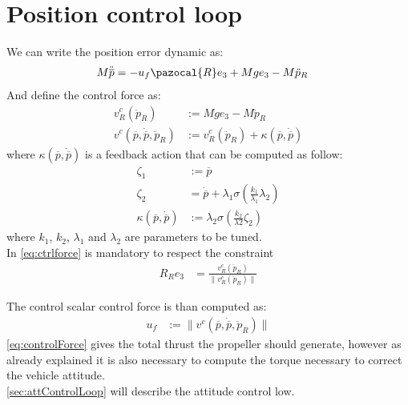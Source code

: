 \section{Position control loop}
We can write the position error dynamic as:
\begin{equation} \label{eq:poserrdyn}
\begin{split}
M \ddot{\overline{p}} &= -u_{f}\pazocal{R}e_{3} + Mge_{3} - M\ddot{p}_{R}
\end{split}
\end{equation}
And define the control force as:
\begin{equation} \label{eq:ctrlforce}
\begin{split}
v^{c}_{R}(\ddot{p}_{R})&:=Mge_{3} - M\ddot{p}_{R}\\
v^{c}(\overline{p},\dot{\overline{p}},\ddot{p}_{R})&:=v^{c}_{R}(\ddot{p}_{R}) + \kappa(\overline{p},\dot{\overline{p}} )
\end{split}
\end{equation}
where $ \kappa(\overline{p},\dot{\overline{p}}) $ is a feedback action that can be computed as follow:
\begin{equation} \label{eq:feedback}
\begin{split}
\zeta_{1}&:=\overline{p}\\
\zeta_{2}&=\dot{\overline{p}} + \lambda_{1} \sigma (\frac{k_{1}}{\lambda_{1}}\lambda_{2})\\
\kappa(\overline{p},\dot{\overline{p}}) &:=\lambda_{2}\sigma(\frac{k_{2}}{\lambda{2}}\zeta_{2})
\end{split}
\end{equation}
where $k_{1}$, $k_{2}$, $\lambda_{1}$ and $\lambda_{2}$ are parameters to be tuned.\\
In \autoref{eq:ctrlforce} is mandatory to respect the constraint
\begin{equation} \label{eq:const}
\begin{split}
R_{R}e_{3} &= \frac{v^{c}_{R}(\ddot{p}_{R})}{\lVert v^{c}_{R}(\ddot{p}_{R})\rVert}
\end{split}
\end{equation}

The control scalar control force is than computed as:
\begin{equation} \label{eq:controlForce}
\begin{split}
u_{f} &:= \lVert v^{c}(\overline{p},\dot{\overline{p}},\ddot{p}_{R})\rVert
\end{split}
\end{equation}
\autoref{eq:controlForce} gives the total thrust the propeller should generate, however as already explained it is also necessary to compute the torque necessary to correct the vehicle attitude.\\
\autoref{sec:attControlLoop} will describe the attitude control low.

